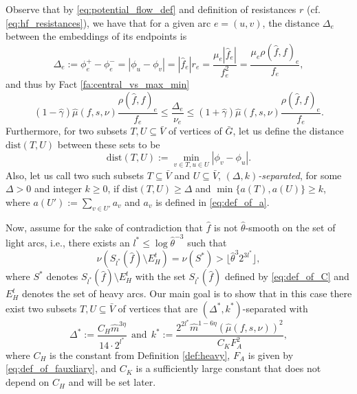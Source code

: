 \documentclass[11pt, letterpaper]{article}
\newcommand{\cheavy}{C_{H}}
\newcommand{\ckstar}{C_{K}}
\newcommand{\fauxiliary}{F_{A}}
\newcommand{\floor}[1]{\lfloor #1 \rfloor}
\newcommand{\oG}{\bar{G}}
\newcommand{\oV}{\bar{V}}
\newcommand{\hm}{\widehat{m}}
\newcommand{\dist}[2]{\mathrm{dist}(#1,#2)}
\newcommand{\Cset}[2]{S_{#1}(#2)}
\newcommand{\hf}{\hat{f}}
\newcommand{\hmu}{\hat{\mu}}
\newcommand{\hgamma}{\hat{\gamma}}
\newcommand{\htheta}{\hat{\theta}}
\newcommand{\vnu}{\boldsymbol{\mathit{\nu}}}
\renewcommand{\aa}{\boldsymbol{\mathit{a}}}
\newcommand{\ff}{\boldsymbol{\mathit{f}}}
\newcommand{\hff}{\boldsymbol{\mathit{\hat{f}}}}
\newcommand{\rr}{\boldsymbol{\mathit{r}}}
\renewcommand{\ss}{\boldsymbol{\mathit{s}}}
\begin{document}
Observe that by \eqref{eq:potential_flow_def} and definition of resistances $\rr$ (cf. \eqref{eq:hf_resistances}), we have that for a given arc $e=(u,v)$, the distance $\Delta_e$ between the embeddings of its endpoints is 
\begin{equation*} \label{eq:def_delta_embedding}
\Delta_e:=\phi_e^+-\phi_e^-=|\phi_u-\phi_v|=|\hf_e|r_e=\frac{\mu_e|\hf_e|}{f_e^2}=\frac{\mu_e\rho(\hff,\ff)_e}{f_e}, 
\end{equation*}
and thus by Fact \ref{fa:central_vs_max_min}
\begin{equation}\label{eq:delta_embedding_estimation}
(1-\hgamma)\hmu(\ff,\ss,\vnu)\frac{\rho(\hff,\ff)_e}{f_e}\leq \frac{\Delta_e}{\nu_e}\leq (1+\hgamma)\hmu(\ff,\ss,\vnu)\frac{\rho(\hff,\ff)_e}{f_e}. 
\end{equation}
Furthermore, for two subsets $T,U\subseteq \oV$ of vertices of $\oG$, let us define the distance $\dist{T}{U}$ between these sets to be
\begin{equation}
\label{eq:distance_def_local}
\dist{T}{U}:=\min_{v\in T,u\in U} |\phi_v-\phi_u|.
\end{equation}
Also, let us call two such subsets $T\subseteq \oV$ and $U\subseteq \oV$, {\em $(\Delta,k)$-separated}, for some $\Delta>0$ and integer $k\geq 0$, if $\dist{T}{U}\geq \Delta$ and $\min\{\aa(T),\aa(U)\}\geq k$, where $\aa(U'):=\sum_{v\in U'} a_v$ and $a_v$ is defined in \eqref{eq:def_of_a}.


Now, assume for the sake of contradiction that $\hff$ is not $\htheta$-smooth on the set of light arcs, i.e., there exists an $l^*\leq \log \htheta^{-3}$ such that
\begin{equation}\label{eq:embedd_local_non_smooth}
\vnu(\Cset{l^*}{\hff}\setminus E_H^t)=\vnu(S^*)>\floor{\htheta^{3} 2^{3l^*}},
\end{equation}
where $S^*$ denotes $\Cset{l^*}{\hff}\setminus E_H^t$ with the set $\Cset{l^*}{\hff}$ defined by \eqref{eq:def_of_C} and $E_H^t$ denotes the set of heavy arcs. Our main goal is to show that in this case there exist two subsets $T,U\subseteq \oV$ of vertices that are $(\Delta^*,k^*)$-separated with 
\begin{equation}
\label{eq:def_delt_star_k_star}
\Delta^*:= \frac{\cheavy \hm^{3\eta}}{14\cdot 2^{l^*}} \ \ \mathrm{ and } \ \ k^*:= \frac{2^{2l^*}\hm^{1-6\eta}(\hmu(\ff,\ss,\vnu))^2}{\ckstar \fauxiliary^2},
\end{equation}
where $\cheavy$ is the constant from Definition \ref{def:heavy}, $\fauxiliary$ is given by \eqref{eq:def_of_fauxliary}, and  $\ckstar$ is a sufficiently large constant that does not depend on $\cheavy$ and will be set later.
\end{document}
